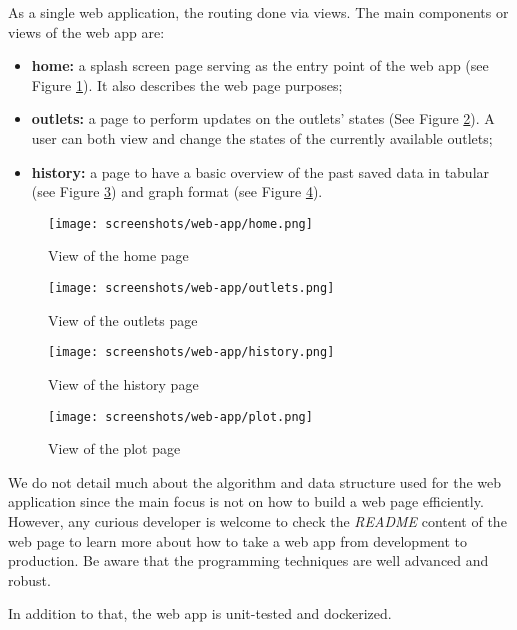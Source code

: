 As a single web application, the routing done via views. The main components or views of the web app are:
\begin{itemize}
    \item \textbf{home:} a splash screen page serving as the entry point of the web app (see Figure \ref{fig:ui-home}). It also describes the web page purposes;
    \item \textbf{outlets:} a page to perform updates on the outlets' states (See Figure \ref{fig:ui-outlets}). A user can both view and change the states of the currently available outlets;
    \item \textbf{history:} a page to have a basic overview of the past saved
    data in tabular (see Figure \ref{fig:ui-history}) and graph format (see
    Figure \ref{fig:ui-plot}).
\end{itemize}

\begin{figure}[ht!]
    \centering
    \texttt{[image: screenshots/web-app/home.png]}
    \caption{View of the home page}
    \label{fig:ui-home}
\end{figure}

\begin{figure}[ht!]
    \centering
    \texttt{[image: screenshots/web-app/outlets.png]}
    \caption{View of the outlets page}
    \label{fig:ui-outlets}
\end{figure}

\begin{figure}[ht!]
    \centering
    \texttt{[image: screenshots/web-app/history.png]}
    \caption{View of the history page}
    \label{fig:ui-history}
\end{figure}

\begin{figure}[ht!]
    \centering
    \texttt{[image: screenshots/web-app/plot.png]}
    \caption{View of the plot page}
    \label{fig:ui-plot}
\end{figure}

We do not detail much about the algorithm and data structure used for the web application since the main focus is not on how to build a web page efficiently. However, any curious developer is welcome to check the \textit{README} content of the web page to learn more about how to take a web app from development to production. Be aware that the programming techniques are well advanced and robust.

In addition to that, the web app is unit-tested and dockerized.
